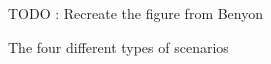\begin{figure}
  \centering
  TODO : Recreate the figure from Benyon
  \caption{The four different types of scenarios \cite[p. 67]{benyon_14}}
  \label{fig:scenarios}
\end{figure}
